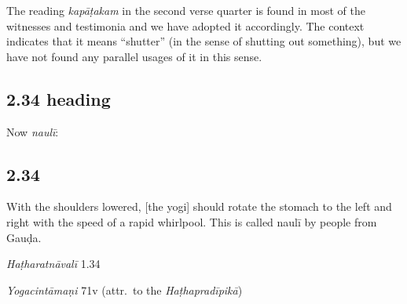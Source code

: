 \begin{ekdosis}
\begin{philcomm}[hp02_033]
The reading \emph{kapāṭakam} in the second verse quarter is found in most of the witnesses and testimonia and we have adopted it accordingly. The context indicates that it means “shutter” (in the sense of shutting out something), but we have not found any parallel usages of it in this sense.
\end{philcomm}

\subsection*{2.34 heading}
\begin{translation}[hp02_034a]
Now \emph{naulī}:
\end{translation}


\subsection*{2.34}
\begin{translation}[hp02_034]
With the shoulders lowered, [the yogi] should rotate the stomach to the left and right with the speed of a rapid whirlpool. This is called naulī by people from Gauḍa.%
\end{translation}


\begin{testimonia}[hp02_034]
\emph{Haṭharatnāvalī} 1.34 

\begin{versinnote}
\end{versinnote}

\emph{Yogacintāmaṇi} 71v (attr.~to the \emph{Haṭhapradīpikā})

\begin{versinnote}
\end{versinnote}


\end{testimonia}
\end{ekdosis}
